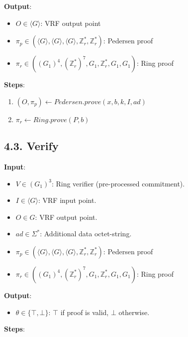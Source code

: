 \documentclass[
]{article}
\providecommand{\tightlist}{%
  \setlength{\itemsep}{0pt}\setlength{\parskip}{0pt}}
\begin{document}
\textbf{Output}:

\begin{itemize}
\tightlist
\item
  \(O \in \langle G \rangle\): VRF output point
\item
  \(\pi_p \in (\langle G \rangle, \langle G \rangle, \langle G \rangle, \mathbb{Z}^*_r, \mathbb{Z}^*_r)\):
  Pedersen proof
\item
  \(\pi_r \in ((G_1)^4, (\mathbb{Z}^*_r)^7, G_1, \mathbb{Z}^*_r, G_1, G_1)\):
  Ring proof
\end{itemize}

\textbf{Steps}:

\begin{enumerate}
\def\labelenumi{\arabic{enumi}.}
\tightlist
\item
  \((O, \pi_p) \gets Pedersen.prove(x, b, k, I, ad)\)
\item
  \(\pi_r \gets Ring.prove(P, b)\)
\end{enumerate}

\subsection{4.3. Verify}\label{verify-2}

\textbf{Input}:

\begin{itemize}
\tightlist
\item
  \(V \in (G_1)^3\): Ring verifier (pre-processed commitment).
\item
  \(I \in \langle G \rangle\): VRF input point.
\item
  \(O \in G\): VRF output point.
\item
  \(ad \in \Sigma^*\): Additional data octet-string.
\item
  \(\pi_p \in (\langle G \rangle, \langle G \rangle, \langle G \rangle, \mathbb{Z}^*_r, \mathbb{Z}^*_r)\):
  Pedersen proof
\item
  \(\pi_r \in ((G_1)^4, (\mathbb{Z}^*_r)^7, G_1, \mathbb{Z}^*_r, G_1, G_1)\):
  Ring proof
\end{itemize}

\textbf{Output}:

\begin{itemize}
\tightlist
\item
  \(\theta \in \{ \top, \bot \}\): \(\top\) if proof is valid, \(\bot\)
  otherwise.
\end{itemize}

\textbf{Steps}:
\end{document}
